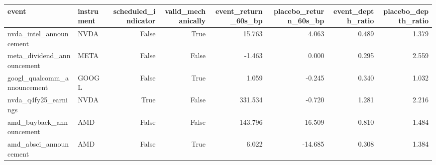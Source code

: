 \begin{tabular}{llrrrrrr}
\toprule
event & instrument & scheduled_indicator & valid_mechanically & event_return_60s_bp & placebo_return_60s_bp & event_depth_ratio & placebo_depth_ratio \\
\midrule
nvda_intel_announcement & NVDA & False & True & 15.763 & 4.063 & 0.489 & 1.379 \\
meta_dividend_announcement & META & False & False & -1.463 & 0.000 & 0.295 & 2.559 \\
googl_qualcomm_announcement & GOOGL & False & True & 1.059 & -0.245 & 0.340 & 1.032 \\
nvda_q4fy25_earnings & NVDA & True & False & 331.534 & -0.720 & 1.281 & 2.216 \\
amd_buyback_announcement & AMD & False & False & 143.796 & -16.509 & 0.810 & 1.484 \\
amd_absci_announcement & AMD & False & True & 6.022 & -14.685 & 0.308 & 1.384 \\
\bottomrule
\end{tabular}
